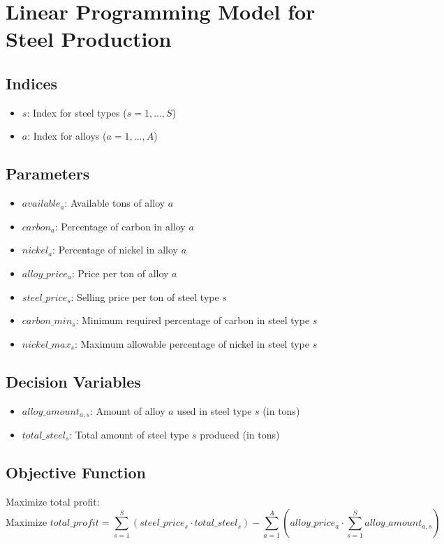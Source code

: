 \documentclass{article}
\begin{document}
\section*{Linear Programming Model for Steel Production}

\subsection*{Indices}
\begin{itemize}
    \item $s$: Index for steel types ($s = 1, \ldots, S$)
    \item $a$: Index for alloys ($a = 1, \ldots, A$)
\end{itemize}

\subsection*{Parameters}
\begin{itemize}
    \item $available_a$: Available tons of alloy $a$
    \item $carbon_{a}$: Percentage of carbon in alloy $a$
    \item $nickel_{a}$: Percentage of nickel in alloy $a$
    \item $alloy\_price_{a}$: Price per ton of alloy $a$
    \item $steel\_price_{s}$: Selling price per ton of steel type $s$
    \item $carbon\_min_{s}$: Minimum required percentage of carbon in steel type $s$
    \item $nickel\_max_{s}$: Maximum allowable percentage of nickel in steel type $s$
\end{itemize}

\subsection*{Decision Variables}
\begin{itemize}
    \item $alloy\_amount_{a,s}$: Amount of alloy $a$ used in steel type $s$ (in tons)
    \item $total\_steel_{s}$: Total amount of steel type $s$ produced (in tons)
\end{itemize}

\subsection*{Objective Function}
Maximize total profit:
\[
\text{Maximize } total\_profit = \sum_{s=1}^{S} (steel\_price_{s} \cdot total\_steel_{s}) - \sum_{a=1}^{A} (alloy\_price_{a} \cdot \sum_{s=1}^{S} alloy\_amount_{a,s})
\]
\end{document}
